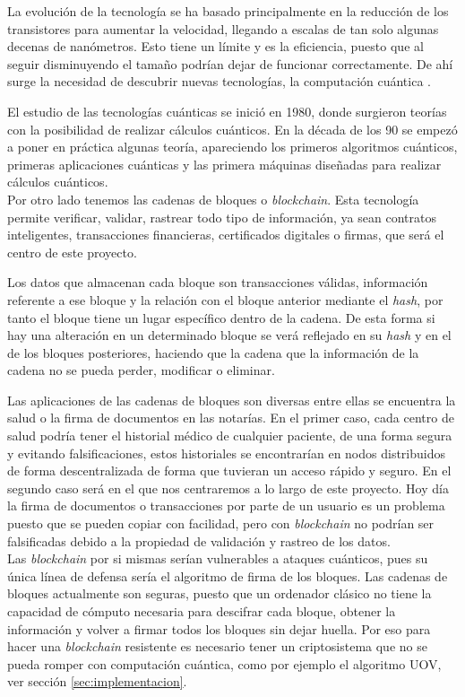 La evolución de la tecnología se ha basado principalmente en la reducción de los transistores para aumentar la velocidad, llegando a escalas de tan solo algunas decenas de nanómetros. Esto tiene un límite y es la eficiencia, puesto que al seguir disminuyendo el tamaño podrían dejar de funcionar correctamente. De ahí surge la necesidad de descubrir nuevas tecnologías, la computación cuántica \cite{computacioncuanticawiki}.

El estudio de las tecnologías cuánticas se inició en 1980, donde surgieron teorías con la posibilidad de realizar cálculos cuánticos. En la década de los 90 se empezó a poner en práctica algunas teoría, apareciendo los primeros algoritmos cuánticos, primeras aplicaciones cuánticas y las primera máquinas diseñadas para realizar cálculos cuánticos.\\



Por otro lado tenemos las cadenas de bloques o \textit{blockchain}. Esta tecnología permite verificar, validar, rastrear todo tipo de información, ya sean contratos inteligentes, transacciones financieras, certificados digitales o firmas, que será el centro de este proyecto.

Los datos que almacenan cada bloque son transacciones válidas, información referente a ese bloque y la relación con el bloque anterior mediante el \textit{hash}, por tanto el bloque tiene un lugar específico dentro de la cadena. De esta forma si hay una alteración en un determinado bloque se verá reflejado en su \textit{hash} y en el de los bloques posteriores, haciendo que la cadena que la información de la cadena no se pueda perder, modificar o eliminar. 

Las aplicaciones de las cadenas de bloques son diversas entre ellas se encuentra la salud o la firma de documentos en las notarías. En el primer caso, cada centro  de salud podría tener el historial médico de cualquier paciente, de una forma segura y evitando falsificaciones, estos historiales se encontrarían en nodos distribuidos de forma descentralizada de forma que tuvieran un acceso rápido y seguro. En el segundo caso será en el que nos centraremos a lo largo de este proyecto. Hoy día la firma de documentos o transacciones por parte de un usuario es un problema puesto que se pueden copiar con facilidad, pero con \textit{blockchain} no podrían ser falsificadas debido a la propiedad de validación y rastreo de los datos.\\

Las \textit{blockchain} por si mismas serían vulnerables a ataques cuánticos, pues su única línea de defensa sería el algoritmo de firma de los bloques. Las cadenas de bloques actualmente son seguras, puesto que un ordenador clásico no tiene la capacidad de cómputo necesaria para descifrar cada bloque, obtener la información y volver a firmar todos los bloques sin dejar huella. Por eso para hacer una \textit{blockchain} resistente es necesario tener un criptosistema que no se pueda romper con computación cuántica, como por ejemplo el algoritmo UOV, ver sección \ref{sec:implementacion}. 






